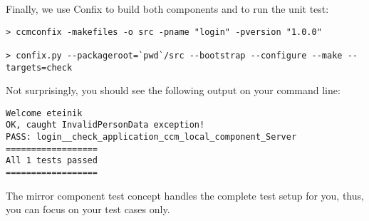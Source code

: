 \vspace{3mm}
Finally, we use Confix to build both components and to run the unit test:
\begin{footnotesize}
\begin{verbatim}
> ccmconfix -makefiles -o src -pname "login" -pversion "1.0.0"

> confix.py --packageroot=`pwd`/src --bootstrap --configure --make --targets=check
\end{verbatim}
\end{footnotesize}
Not surprisingly, you should see the following output on your command line:
\begin{footnotesize}
\begin{verbatim}
Welcome eteinik
OK, caught InvalidPersonData exception!
PASS: login__check_application_ccm_local_component_Server
==================
All 1 tests passed
==================
\end{verbatim}
\end{footnotesize}

The mirror component test concept handles the complete test setup for you, thus,
you can focus on your test cases only.

 \newpage

